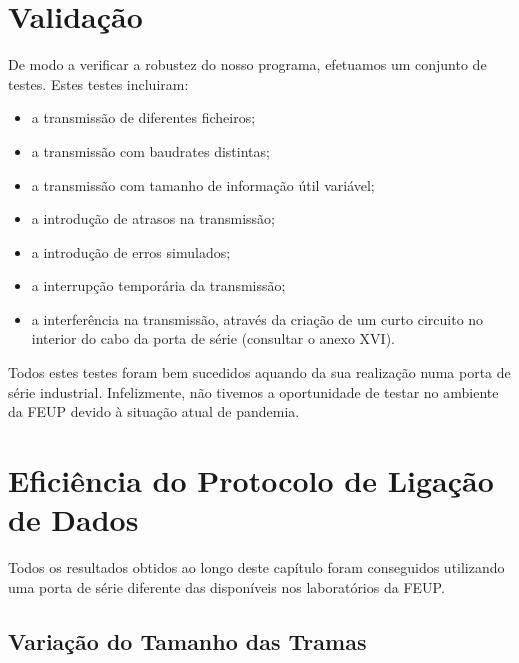 \documentclass[article, a4paper, 11pt, oneside]{memoir}
\begin{document}
\chapter[Validação][Validação]{Validação} \label{\thechapter}

De modo a verificar a robustez do nosso programa, efetuamos um conjunto de testes.
Estes testes incluiram:

\begin{itemize}
    \item a transmissão de diferentes ficheiros;
    \item a transmissão com baudrates distintas;
    \item a transmissão com tamanho de informação útil variável;
    \item a introdução de atrasos na transmissão;
    \item a introdução de erros simulados;
    \item a interrupção temporária da transmissão;
    \item a interferência na transmissão, através da criação de um curto circuito
    no interior do cabo da porta de série (consultar o anexo XVI).
\end{itemize}

Todos estes testes foram bem sucedidos aquando da sua realização numa porta de série industrial.
Infelizmente, não tivemos a oportunidade de testar no ambiente da FEUP devido à situação atual de pandemia.



\chapter[Eficiência do Protocolo de Ligação de Dados][Eficiência do Protocolo de Ligação de Dados]{Eficiência do Protocolo de Ligação de Dados} \label{\thechapter}

Todos os resultados obtidos ao longo deste capítulo foram conseguidos utilizando uma porta de
série diferente das disponíveis nos laboratórios da FEUP.

\section{Variação do Tamanho das Tramas}
\end{document}
